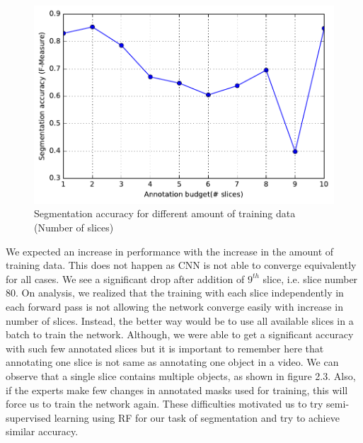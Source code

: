 \begin{figure}[h!]\label{fig:cnnslices1}
\centering
 \includegraphics[width=0.9\linewidth]{figures/cnn_diff_slices.pdf} 
\caption{Segmentation accuracy for different amount of training data (Number of slices)}
\end{figure}

We expected an increase in performance with the increase in the amount of training data. This does not happen as CNN is not able to converge equivalently for all cases. We see a significant drop after addition of $9^{th}$ slice, i.e. slice number 80. On analysis, we realized that the training with each slice independently in each forward pass is not allowing the network converge easily with increase in number of slices. Instead, the better way would be to use all available slices in a batch to train the network. Although, we were able to get a significant accuracy with such few annotated slices but it is important to remember here that annotating one slice is not same as annotating one object in a video. We can observe that a single slice contains multiple objects, as shown in figure 2.3. Also, if the experts make few changes in annotated masks used for training, this will force us to train the network again. These difficulties motivated us to try semi-supervised learning using RF for our task of segmentation and try to achieve similar accuracy.

